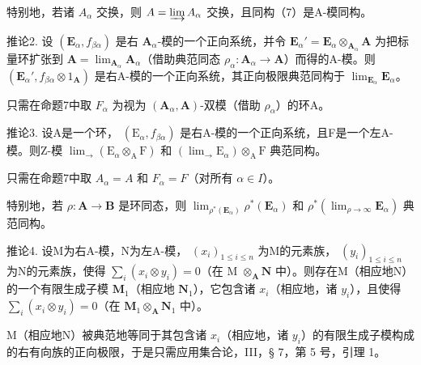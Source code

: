 特别地，若诸 \(A_{\alpha}\) 交换，则 \(A = \varinjlim A_{\alpha}\) 交换，且同构（7）是A-模同构。

推论2. 设 \((\mathbf{E}_{\alpha}, f_{\beta \alpha})\) 是右 \(\mathbf{A}_{\alpha}\)-模的一个正向系统，并令 \(\mathbf{E}_{\alpha}' = \mathbf{E}_{\alpha} \otimes_{\mathbf{A}_{\alpha}} \mathbf{A}\) 为把标量环扩张到 \(\mathbf{A} = \lim_{\mathbf{A}_{\alpha}} \mathbf{A}_{\alpha}\)（借助典范同态 \(\rho_{\alpha}: \mathbf{A}_{\alpha} \to \mathbf{A}\)）而得的A-模。则 \((\mathbf{E}_{\alpha}', f_{\beta \alpha} \otimes 1_{\mathbf{A}})\) 是右A-模的一个正向系统，其正向极限典范同构于 \(\lim_{\mathbf{E}_{\alpha}} \mathbf{E}_{\alpha}\)。

只需在命题7中取 \(F_{\alpha}\) 为视为 \((\mathbf{A}_{\alpha}, \mathbf{A})\)-双模（借助 \(\rho_{\alpha}\)）的环A。

推论3. 设A是一个环， \((\mathrm{E}_{\alpha}, f_{\beta\alpha})\) 是右A-模的一个正向系统，且F是一个左A-模。则Z-模 \(\lim_{\longrightarrow} (\mathrm{E}_{\alpha} \otimes_{\mathrm{A}} \mathrm{F})\) 和 \((\lim_{\longrightarrow} \mathrm{E}_{\alpha}) \otimes_{\mathrm{A}} \mathrm{F}\) 典范同构。

只需在命题7中取 \(A_{\alpha} = A\) 和 \(F_{\alpha} = F\)（对所有 \(\alpha \in I\)）。

特别地，若 \(\rho: \mathbf{A} \to \mathbf{B}\) 是环同态，则 \(\lim_{\rho^* (\mathbf{E}_\alpha)} \rho^*(\mathbf{E}_\alpha)\) 和 \(\rho^*(\lim_{\rho \to \infty} \mathbf{E}_\alpha)\) 典范同构。

推论4. 设M为右A-模，N为左A-模， \((x_{i})_{1\leqslant i\leqslant n}\) 为M的元素族， \((y_{i})_{1\leqslant i\leqslant n}\) 为N的元素族，使得 \(\sum_{i}(x_{i}\otimes y_{i}) = 0\)（在 M \(\otimes_{\mathbf{A}}\mathbf{N}\) 中）。则存在M（相应地N）的一个有限生成子模 \(\mathbf{M}_1\)（相应地 \(\mathbf{N}_1\)），它包含诸 \(x_{i}\)（相应地，诸 \(y_{i}\)），且使得 \(\sum_{i}(x_{i}\otimes y_{i}) = 0\)（在 \(\mathbf{M}_1\otimes_{\mathbf{A}}\mathbf{N}_1\) 中）。

M（相应地N）被典范地等同于其包含诸 \(x_{i}\)（相应地，诸 \(y_{i}\)）的有限生成子模构成的右有向族的正向极限，于是只需应用集合论，III，§ 7，第 5 号，引理 1。

